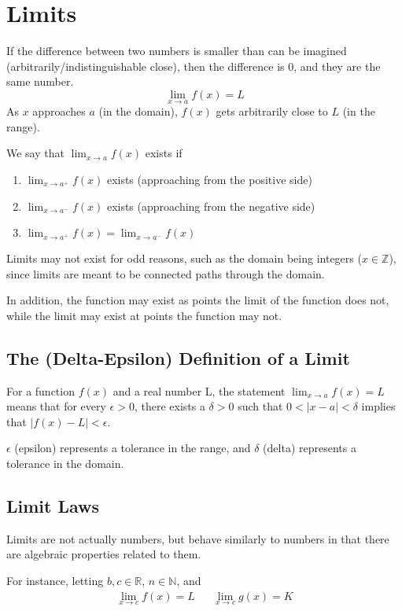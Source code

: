 \documentclass{article}
\begin{document}
\section{Limits}
If the difference between two numbers is smaller than can be imagined (arbitrarily/indistinguishable close), then the difference is $0$, and they are the same number.
$$\lim_{x\to a}f(x)=L$$
As $x$ approaches $a$ (in the domain), $f(x)$ gets arbitrarily close to $L$ (in the range).

We say that $\lim_{x\to a}\limits f(x)$ exists if
\begin{enumerate}
    \item $\lim_{x\to a^+}\limits f(x)$ exists (approaching from the positive side)
    \item $\lim_{x\to a^-}\limits f(x)$ exists (approaching from the negative side)
    \item $\lim_{x\to a^+}\limits f(x) = \lim_{x\to a^-}\limits f(x)$
\end{enumerate}

Limits may not exist for odd reasons, such as the domain being integers ($x\in\mathbb{Z}$), since limits are meant to be connected paths through the domain.

In addition, the function may exist as points the limit of the function does not, while the limit may exist at points the function may not.

\subsection{The (Delta-Epsilon) Definition of a Limit}
For a function $f(x)$ and a real number L, the statement $\lim_{x\to a}\limits f(x) = L$ means that for every $\epsilon > 0$, there exists a $\delta > 0$ such that $0 < |x-a| < \delta$ implies that $|f(x) - L| < \epsilon$.

$\epsilon$ (epsilon) represents a tolerance in the range, and $\delta$ (delta) represents a tolerance in the domain.

\subsection{Limit Laws}\label{limit-laws}
Limits are not actually numbers, but behave similarly to numbers in that there are algebraic properties related to them.

For instance, letting $b,c \in \mathbb{R}$, $n \in \mathbb{N}$, and
\begin{align*}
    \lim_{x\to c} f(x) = L  & & \lim_{x \to c} g(x) = K
\end{align*}
\end{document}
